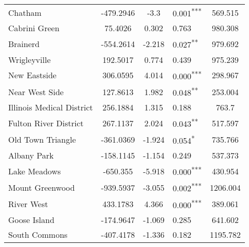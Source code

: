 \documentclass[12pt]{report}
\begin{document}
\begin{longtable}{l S[table-format=6.4] S[table-format=3.4] l S[table-format=4.4]}
	Chatham                      & -479.2946            & -3.3             & 0.001\textsuperscript{***} & 569.515                           \\
	Cabrini Green                & 75.4026              & 0.302            & 0.763                      & 980.308                           \\
	Brainerd                     & -554.2614            & -2.218           & 0.027\textsuperscript{**}  & 979.692                           \\
	Wrigleyville                 & 192.5017             & 0.774            & 0.439                      & 975.239                           \\
	New Eastside                 & 306.0595             & 4.014            & 0.000\textsuperscript{***} & 298.967                           \\
	Near West Side               & 127.8613             & 1.982            & 0.048\textsuperscript{**}  & 253.004                           \\
	Illinois Medical District    & 256.1884             & 1.315            & 0.188                      & 763.7                             \\
	Fulton River District        & 267.1137             & 2.024            & 0.043\textsuperscript{**}  & 517.597                           \\
	Old Town Triangle            & -361.0369            & -1.924           & 0.054\textsuperscript{*}   & 735.766                           \\
	Albany Park                  & -158.1145            & -1.154           & 0.249                      & 537.373                           \\
	Lake Meadows                 & -650.355             & -5.918           & 0.000\textsuperscript{***} & 430.954                           \\
	Mount Greenwood              & -939.5937            & -3.055           & 0.002\textsuperscript{***} & 1206.004                          \\
	River West                   & 433.1783             & 4.366            & 0.000\textsuperscript{***} & 389.061                           \\
	Goose Island                 & -174.9647            & -1.069           & 0.285                      & 641.602                           \\
	South Commons                & -407.4178            & -1.336           & 0.182                      & 1195.782                          \\

\end{longtable}
\end{document}
